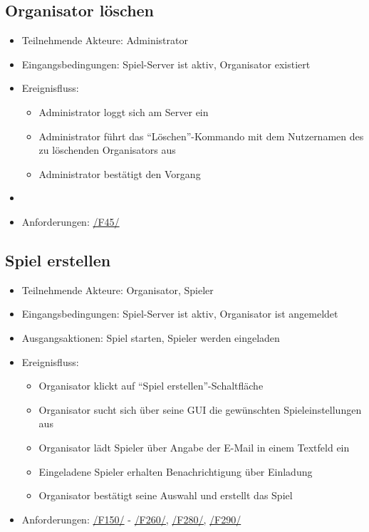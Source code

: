\documentclass[a4paper]{scrreprt}
\begin{document}
    \subsection{Organisator löschen}
    \begin{itemize}
        \item Teilnehmende Akteure: \Gls{Administrator}
        \item Eingangsbedingungen: \Gls{Spiel-Server} ist aktiv, \Gls{Organisator} existiert
        \item Ereignisfluss:
        \begin{itemize}
            \item \Gls{Administrator} loggt sich am Server ein
            \item \Gls{Administrator} führt das \enquote{Löschen}-Kommando mit dem Nutzernamen des zu löschenden \Gls{Organisator}s aus
            \item \Gls{Administrator} bestätigt den Vorgang
        \end{itemize}
        \item \item Anforderungen: \hyperlink{F45}{/F45/}
    \end{itemize}

    \subsection{Spiel erstellen}
    \begin{itemize}
        \item Teilnehmende Akteure: \Gls{Organisator}, \Gls{Spieler}
        \item Eingangsbedingungen: \Gls{Spiel-Server} ist aktiv, \Gls{Organisator} ist angemeldet
        \item Ausgangsaktionen: \Gls{Spiel} starten, \Gls{Spieler} werden eingeladen
        \item Ereignisfluss:
        \begin{itemize}
            \item \Gls{Organisator} klickt auf \enquote{Spiel erstellen}-Schaltfläche
            \item \Gls{Organisator} sucht sich über seine GUI die gewünschten \Gls{Spieleinstellungen} aus
            \item \Gls{Organisator} lädt \Gls{Spieler} über Angabe der E-Mail in einem Textfeld ein
            \item Eingeladene \Gls{Spieler} erhalten Benachrichtigung über Einladung
            \item \Gls{Organisator} bestätigt seine Auswahl und erstellt das Spiel
        \end{itemize}
        \item Anforderungen: \hyperlink{F150}{/F150/} - \hyperlink{F260}{/F260/,} \hyperlink{F280}{/F280/,} \hyperlink{F290}{/F290/}
    \end{itemize}
\end{document}
